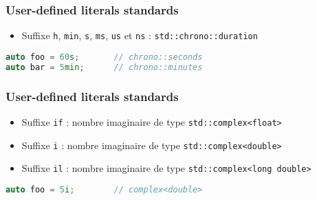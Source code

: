 \documentclass[C++.tex]{subfiles}
\begin{document}
\begin{frame}[fragile]
	\frametitle{User-defined literals standards}
	\begin{itemize}
		\item Suffixe \lstinline|h|, \lstinline|min|, \lstinline|s|, \lstinline|ms|, \lstinline|us| et \lstinline|ns| : \lstinline|std::chrono::duration|
	\end{itemize}

	\begin{lstlisting}[language=C++]
auto foo = 60s;       // chrono::seconds
auto bar = 5min;      // chrono::minutes\end{lstlisting}
\end{frame}

\begin{frame}[fragile]
	\frametitle{User-defined literals standards}
	\begin{itemize}
		\item Suffixe \lstinline[keywordstyle=\color{black}]|if| : nombre imaginaire de type \lstinline|std::complex<float>|
		\item Suffixe \lstinline|i| : nombre imaginaire de type \lstinline|std::complex<double>|
		\item Suffixe \lstinline|il| : nombre imaginaire de type \lstinline|std::complex<long double>|
	\end{itemize}

	\begin{lstlisting}[language=C++]
auto foo = 5i;        // complex<double>\end{lstlisting}
\end{frame}
\end{document}
